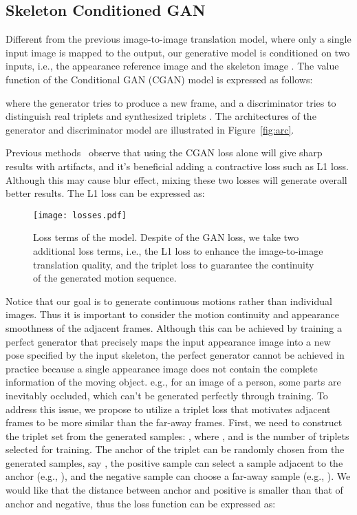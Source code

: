 \documentclass[journal]{IEEEtran}
\begin{document}
\subsection{Skeleton Conditioned GAN}
Different from the previous image-to-image translation model, where only a single input image is mapped to the output, our generative model is conditioned on two inputs, i.e., the appearance reference image  and the skeleton image .
The value function of the Conditional GAN (CGAN) model is expressed as follows:

where the generator  tries to produce a new frame, and a discriminator  tries to distinguish real triplets  and synthesized triplets .
The architectures of the generator and discriminator model are illustrated in Figure~\ref{fig:arc}.

Previous methods~\cite{DBLP:journals/corr/IsolaZZE16,DBLP:journals/corr/MathieuCL15} observe that using the CGAN loss alone will give sharp results with artifacts, and it's beneficial adding a contractive loss such as L1 loss. Although this may cause blur effect, mixing these two losses will generate overall better results. The L1 loss can be expressed as:



\begin{figure}[t]
\center
\texttt{[image: losses.pdf]}
\caption{Loss terms of the model. Despite of the GAN loss, we take two additional loss terms, i.e., the L1 loss to enhance the image-to-image translation quality, and the triplet loss to guarantee the continuity of the generated motion sequence.}
\label{fig:losses}
\end{figure}

Notice that our goal is to generate continuous motions rather than individual images. Thus it is important to consider the motion continuity and appearance smoothness of the adjacent frames. Although this can be achieved by training a perfect generator that precisely maps the input appearance image into a new pose specified by the input skeleton, the perfect generator cannot be achieved in practice because a single appearance image does not contain the complete information of the moving object. e.g., for an image of a person, some parts are inevitably occluded, which can't be generated perfectly through training. To address this issue, we propose to utilize a triplet loss that motivates adjacent frames to be more similar than the far-away frames. First, we need to construct the triplet set  from the generated samples: ,
where , and  is the number of triplets selected for training. The anchor of the triplet can be randomly chosen from the generated samples, say , the positive sample can select a sample adjacent to the anchor (e.g., ), and the negative sample can choose a far-away sample (e.g., ). We would like that the distance between anchor and positive is smaller than that of anchor and negative, thus the loss function can be expressed as:
\end{document}
